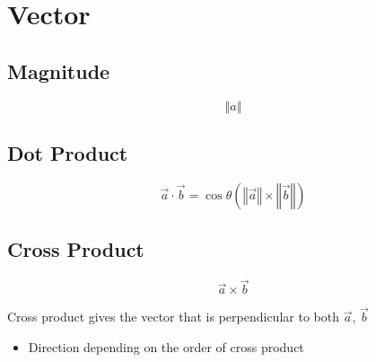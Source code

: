 \chapter{Vector}

\section{Magnitude}

  \begin{equation}
    \left\Vert a \right\Vert
  \end{equation}

\section{Dot Product}

  \begin{equation}
    \vec{a} \cdot \vec{b} = \cos \theta
    \left( \left\Vert \vec{a} \right\Vert \times \left\Vert \vec{b} \right\Vert \right)
  \end{equation}

\section{Cross Product}

  \begin{equation}
    \vec{a} \times \vec{b}
  \end{equation}

  Cross product gives the vector that is perpendicular to both $ \vec{a} $,
  $ \vec{b} $

  \begin{itemize}
    \item Direction depending on the order of cross product
  \end{itemize}

